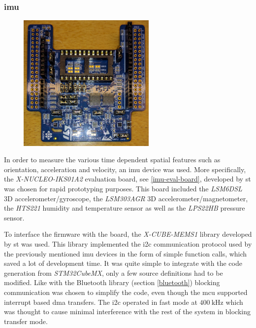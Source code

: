 \subsubsection{\gls{imu}}
\begin{figure}[H]
\centering
\includegraphics[width=0.6\textwidth]{Figures/x-nucleo-iks01a2.jpg}
\label{imu-eval-board}
\end{figure}

In order to measure the various time dependent spatial features such as orientation, acceleration and velocity, an \gls{imu} device was used. More specifically, the \emph{X-NUCLEO-IKS01A2}\cite{x-nucleo-iks01a2} evaluation board, see \autoref{imu-eval-board}, developed by \gls{st} was chosen for rapid prototyping purposes. This board included the \emph{LSM6DSL} 3D accelerometer/gyroscope, the \emph{LSM303AGR} 3D accelerometer/magnetometer, the \emph{HTS221} humidity and temperature sensor as well as the \emph{LPS22HB} pressure sensor.

To interface the firmware with the board, the \emph{X-CUBE-MEMS1}\cite{x-cube-mems1} library developed by \gls{st} was used. This library implemented the \gls{i2c} communication protocol used by the previously mentioned \gls{imu} devices in the form of simple function calls, which saved a lot of development time. It was quite simple to integrate with the code generation from \emph{STM32CubeMX}, only a few source definitions had to be modified. Like with the Bluetooth library (section \ref{bluetooth}) blocking communication was chosen to simplify the code, even though the \gls{mcu} supported interrupt based \gls{dma} transfers. The \gls{i2c} operated in fast mode at $400~\textrm{kHz}$ which was thought to cause minimal interference with the rest of the system in blocking transfer mode.

